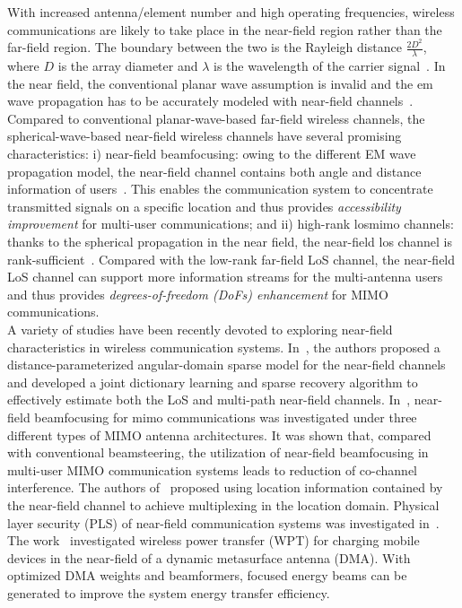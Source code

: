 \documentclass[12pt, draftclsnofoot, onecolumn]{IEEEtran}
\newcommand{\mimo}{\gls{mimo}\xspace}
\newcommand{\los}{\gls{los}\xspace}
\newcommand{\emm}{\gls{em}\xspace}
\begin{document}
\indent With increased antenna/element number and high operating frequencies, wireless communications are likely to take place in the near-field region rather than the far-field region. The boundary between the two is the Rayleigh distance $\frac{2D^2}{\lambda}$, where $D$ is the array diameter and $\lambda$ is the wavelength of the carrier signal~\cite{7942128}. In the near field, the conventional planar wave assumption is invalid and the \emm wave propagation has to be accurately modeled with near-field channels~\cite{bjornson2021primer}. Compared to conventional planar-wave-based far-field wireless channels, the spherical-wave-based near-field wireless channels have several promising characteristics: i) {near-field beamfocusing:} owing to the different EM wave propagation model, the near-field channel contains both angle and distance information of users~\cite{9536436}. This enables the communication system to concentrate transmitted signals on a specific location and thus provides \emph{accessibility improvement} for multi-user communications; and ii) {high-rank \los \mimo channels:} thanks to the spherical propagation in the near field, the near-field \los channel is rank-sufficient~\cite{miller2019waves}. Compared with the low-rank far-field LoS channel, the near-field LoS channel can support more information streams for the multi-antenna users and thus provides \emph{degrees-of-freedom (DoFs) enhancement} for MIMO communications.\\
\indent A variety of studies have been recently devoted to exploring near-field characteristics in wireless communication systems. In~\cite{zhang2022near}, the authors proposed a distance-parameterized angular-domain sparse model for the near-field channels and developed a joint dictionary learning and sparse recovery algorithm to effectively estimate both the LoS and multi-path near-field channels. In~\cite{zhang2022beam}, near-ﬁeld beamfocusing for \mimo communications was investigated under three different types of MIMO antenna architectures. It was shown that, compared with conventional beamsteering, the utilization of near-field beamfocusing in multi-user MIMO communication systems leads to reduction of co-channel interference. The authors of~\cite{wu2022multiple} proposed using location information contained by the near-field channel to achieve multiplexing in the location domain. Physical layer security (PLS) of near-field communication systems was investigated in~\cite{zhang2023physical}. The work~\cite{zhang2022near1} investigated wireless power transfer (WPT) for charging mobile devices in the near-field of a dynamic metasurface antenna (DMA). With optimized DMA weights and beamformers, focused energy beams can be generated to improve the system energy transfer efficiency.\\
\end{document}
